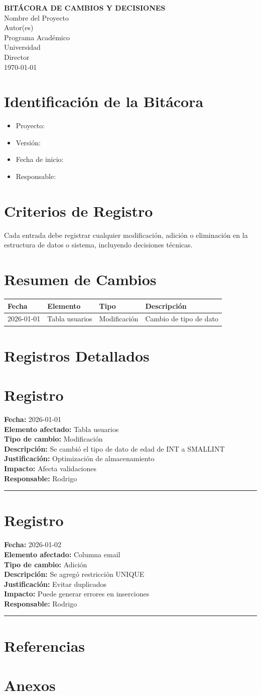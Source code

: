 \documentclass[12pt]{article}
\newcommand{\portada}{
\begin{titlepage}
\centering

\vspace*{3cm}

{\Large \textbf{BITÁCORA DE CAMBIOS Y DECISIONES}}\\[1.5cm]

{\large Nombre del Proyecto}\\[1cm]

{\large Autor(es)}\\
{\large Programa Académico}\\
{\large Universidad}\\[1cm]

{\large Director}\\[2cm]

{\large \today}

\vfill

\end{titlepage}
}
\newcommand{\entradaBitacora}[7]{
\section*{Registro}
\textbf{Fecha:} #1\\
\textbf{Elemento afectado:} #2\\
\textbf{Tipo de cambio:} #3\\
\textbf{Descripción:} #4\\
\textbf{Justificación:} #5\\
\textbf{Impacto:} #6\\
\textbf{Responsable:} #7\\
\hrule
\vspace{0.5cm}
}
\begin{document}
\portada

\tableofcontents
\newpage

\section{Identificación de la Bitácora}
\begin{itemize}
\item Proyecto:
\item Versión:
\item Fecha de inicio:
\item Responsable:
\end{itemize}

\section{Criterios de Registro}
Cada entrada debe registrar cualquier modificación, adición o eliminación en la estructura de datos o sistema, incluyendo decisiones técnicas.

\section{Resumen de Cambios}



\begin{longtable}{|p{2cm}|p{3cm}|p{3cm}|p{6cm}|}
\hline
Fecha & Elemento & Tipo & Descripción \\
\hline
2026-01-01 & Tabla usuarios & Modificación & Cambio de tipo de dato \\
\hline
\end{longtable}

\section{Registros Detallados}

\entradaBitacora
{2026-01-01}
{Tabla usuarios}
{Modificación}
{Se cambió el tipo de dato de edad de INT a SMALLINT}
{Optimización de almacenamiento}
{Afecta validaciones}
{Rodrigo}



\entradaBitacora
{2026-01-02}
{Columna email}
{Adición}
{Se agregó restricción UNIQUE}
{Evitar duplicados}
{Puede generar errores en inserciones}
{Rodrigo}

\section{Referencias}
\printbibliography

\section{Anexos}
\end{document}
